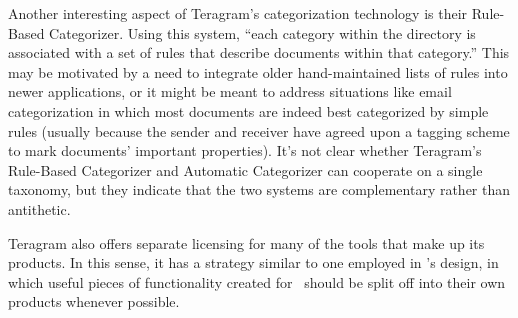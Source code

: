 Another interesting aspect of Teragram's categorization technology is
their Rule-Based Categorizer.  Using this system, ``each category
within the directory is associated with a set of rules that describe
documents within that category.''  This may be motivated by a need to
integrate older hand-maintained lists of rules into newer
applications, or it might be meant to address situations like email
categorization in which most documents are indeed best categorized by
simple rules (usually because the sender and receiver have agreed upon
a tagging scheme to mark documents' important properties).  It's not
clear whether Teragram's Rule-Based Categorizer and Automatic
Categorizer can cooperate on a single taxonomy, but they indicate that
the two systems are complementary rather than antithetic.

Teragram also offers separate licensing for many of the tools that
make up its products.  In this sense, it has a strategy similar to one
employed in \aicat's design, in which useful pieces of
functionality created for \aicat\ should be split off into
their own products whenever possible.

